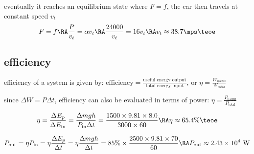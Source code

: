 eventually it reaches an equilibrium state where $F=f$, the car then travels at constant speed $v_t$
\begin{equation*}
F=f \RA \frac{P}{v_t} = \alpha v_t \RA \frac{24000}{v_t} = 16v_t \RA v_t \approx 38.7\mps \teoe
\end{equation*}



\subsection{efficiency}

efficiency of a system is given by: $\text{efficiency} = \frac{\text{useful energy output}}{\text{total energy input}} $, or $\boxed{\eta = \frac{W_\text{useful}}{W_\text{total}}}$

since $\Delta W = P \Delta t$, efficiency can also be evaluated in terms of power: $\boxed{\eta = \frac{P_\text{useful}}{P_\text{total}}}$ 


\solc\begin{equation*}
	\eta = \frac{\Delta E_p}{\Delta E_\text{in}} = \frac{\Delta m g h}{P_\text{in} \Delta t} = \frac{1500\times9.81\times8.0}{3000\times60} \RA \eta \approx 65.4 \% \teoe 
\end{equation*}


\solc\begin{equation*}
P_\text{out} = \eta P_\text{in} = \eta \frac{\Delta E_p}{\Delta t} = \eta \frac{\Delta m g h}{\Delta t} = 85\% \times \frac{2500 \times 9.81 \times 70}{60} \RA P_\text{out} \approx 2.43 \times 10^4 \text{ W}
\end{equation*}


